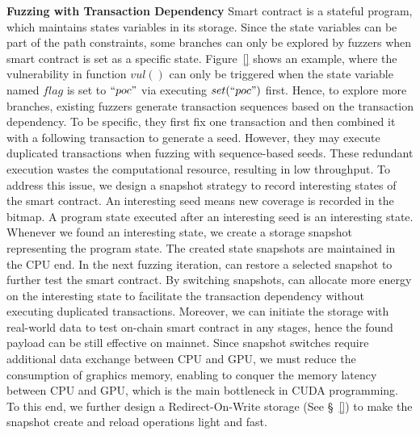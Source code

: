 
\noindent \textbf{Fuzzing with Transaction Dependency}
\label{design:snapshot}
Smart contract is a stateful program, which maintains states variables in its storage. Since the state variables can be part of the path constraints, some branches can only be explored by fuzzers when smart contract is set as a specific state. 
%
Figure~\ref{} shows an example, where the vulnerability in function $vul()$ can only be triggered when the state variable named $flag$ is set to $``poc"$ via executing $set(``poc")$ first. 
%
Hence, to explore more branches, existing fuzzers generate transaction sequences based on the transaction dependency\cite{confuzzie, echidna}. 
%
To be specific, they first fix one transaction and then combined it with a following transaction to generate a seed. However, they may execute duplicated transactions when fuzzing with sequence-based seeds. These redundant execution wastes the computational resource, resulting in low throughput. 
%
%
To address this issue, we design a snapshot strategy to record interesting states of the smart contract. An interesting seed means new coverage is recorded in the bitmap. A program state executed after an interesting seed is an interesting state. 
%
Whenever we found an interesting state, we create a storage snapshot representing the program state. 
The created state snapshots are maintained in the CPU end. 
%
In the next fuzzing iteration, {\tool} can restore a selected snapshot to further test the smart contract.
%
By switching snapshots, {\tool} can allocate more energy on the interesting state to facilitate the transaction dependency without executing duplicated transactions. Moreover, we can initiate the storage with real-world data to test on-chain smart contract in any stages, hence the found payload can be still effective on mainnet. 
%
Since snapshot switches require additional data exchange between CPU and GPU, we must reduce the consumption of graphics memory, enabling {\tool} to conquer the memory latency between CPU and GPU, which is the main bottleneck in CUDA programming. 
To this end, we further design a Redirect-On-Write storage (See \S~\ref{}) to make the snapshot create and reload operations light and fast.


